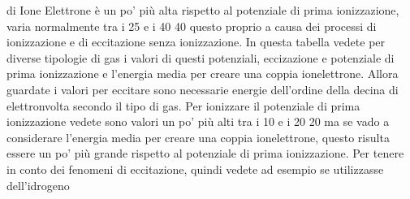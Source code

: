 {di Ione Elettrone è un po' più alta rispetto al potenziale di prima ionizzazione, varia normalmente tra i 25 e i 40 40 questo proprio a causa dei processi di ionizzazione e di eccitazione senza ionizzazione. In questa tabella vedete per diverse tipologie di gas i valori di questi potenziali, eccizazione e potenziale di prima ionizzazione e l'energia media per creare una coppia ionelettrone. Allora guardate i valori per eccitare sono necessarie energie dell'ordine della decina di elettronvolta secondo il tipo di gas. Per ionizzare il potenziale di prima ionizzazione vedete sono valori un po' più alti tra i 10 e i 20 20 ma se vado a considerare l'energia media per creare una coppia ionelettrone, questo risulta essere un po' più grande rispetto al potenziale di prima ionizzazione. Per tenere in conto dei fenomeni di eccitazione, quindi vedete ad esempio se utilizzasse dell'idrogeno 

}
